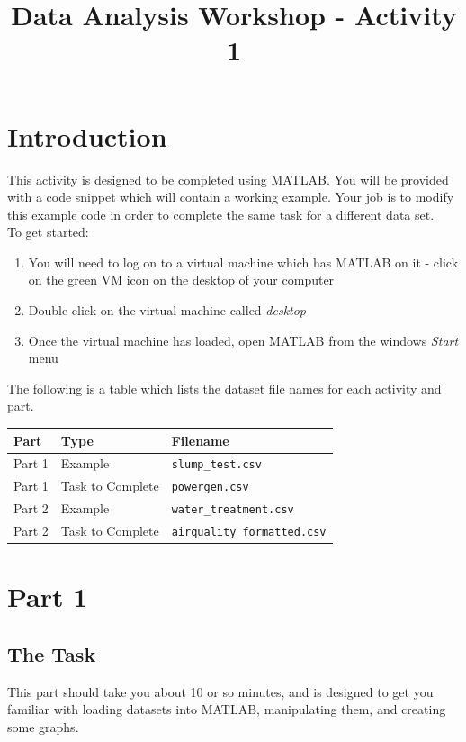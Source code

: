 \documentclass[12pt]{article}
\begin{document}
 
\title{Data Analysis Workshop - Activity 1}
\author{}
\date{}
\maketitle

\section*{Introduction}
This activity is designed to be completed using MATLAB. You will be provided with a code snippet which will contain a working example. Your job is to modify this example code in order to complete the same task for a different data set.\\

To get started:
\begin{enumerate}
\item You will need to log on to a virtual machine which has MATLAB on it - click on the green VM icon on the desktop of your computer
\item Double click on the virtual machine called \textit{desktop}
\item Once the virtual machine has loaded, open MATLAB from the windows \textit{Start} menu
\end{enumerate}
\vspace{0.5cm}
The following is a table which lists the dataset file names for each activity and part.
\begin{table}[h]
\centering
\begin{tabular}{l l l}
\toprule
\textbf{Part} & \textbf{Type} & \textbf{Filename}\\
\midrule
Part 1 & Example & \verb|slump_test.csv|\\
Part 1 & Task to Complete & \verb|powergen.csv|\\
Part 2 & Example & \verb|water_treatment.csv|\\
Part 2 & Task to Complete & \verb|airquality_formatted.csv|\\
\bottomrule
\end{tabular}
\end{table}

\section*{Part 1}
\subsection*{The Task}
This part should take you about 10 or so minutes, and is designed to get you familiar with loading datasets into MATLAB, manipulating them, and creating some graphs.\\
\end{document}
